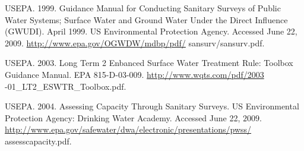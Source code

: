 \documentclass[10pt]{article}
\begin{document}
USEPA. 1999. Guidance Manual for Conducting Sanitary Surveys of Public Water Systems; Surface Water and Ground Water Under the Direct Influence (GWUDI). April 1999. US Environmental Protection Agency. Accessed June 22, 2009. \href{http://www.epa.gov/OGWDW/mdbp/pdf/}{http://www.epa.gov/OGWDW/mdbp/pdf/} sansurv/sansurv.pdf.

USEPA. 2003. Long Term 2 Enbanced Surface Water Treatment Rule: Toolbox Guidance Manual. EPA 815-D-03-009. \href{http://www.wqts.com/pdf/2003}{http://www.wqts.com/pdf/2003} -01\_LT2\_ESWTR\_Toolbox.pdf.

USEPA. 2004. Assessing Capacity Through Sanitary Surveys. US Environmental Protection Agency: Drinking Water Academy. Accessed June 22, $2009 .$ \href{http://www.epa.gov/safewater/dwa/electronic/presentations/pwss/}{http://www.epa.gov/safewater/dwa/electronic/presentations/pwss/} assesscapacity.pdf.
\end{document}

